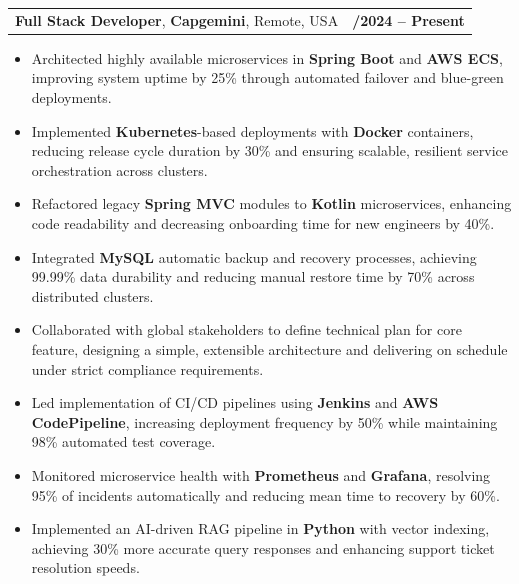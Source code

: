 \documentclass[letterpaper,11pt]{article}
\makeatletter
\newcommand{\resumeItem}[1]{
  \item\footnotesize{
    {#1 \vspace{-2pt}}
  }
}
\newcommand{\resumeSubheading}[4]{
  \vspace{-2pt}\item
    \begin{tabular*}{1.0\textwidth}[t]{l@{\extracolsep{\fill}}r}
      \textbf{\fontsize{10pt}{14pt}\selectfont #3}, \textbf{\fontsize{10pt}{14pt}\selectfont #1}, \fontsize{10pt}{14pt}\selectfont #4 & \textbf{\fontsize{10pt}{14pt}\selectfont #2} \\
    \end{tabular*}\vspace{-7pt}
}
\newcommand{\resumeItemListStart}{\begin{itemize}[leftmargin=*]}
\newcommand{\resumeItemListEnd}{\end{itemize}\vspace{-5pt}}
\makeatother
\begin{document}
    \resumeSubheading
        {Capgemini}{01/2024 -- Present}
        {Full Stack Developer}{Remote, USA}
      \resumeItemListStart
        \resumeItem{Architected highly available microservices in \textbf{Spring Boot} and \textbf{AWS ECS}, improving system uptime by 25\% through automated failover and blue-green deployments.}
        \resumeItem{Implemented \textbf{Kubernetes}-based deployments with \textbf{Docker} containers, reducing release cycle duration by 30\% and ensuring scalable, resilient service orchestration across clusters.}
        \resumeItem{Refactored legacy \textbf{Spring MVC} modules to \textbf{Kotlin} microservices, enhancing code readability and decreasing onboarding time for new engineers by 40\%.}
        \resumeItem{Integrated \textbf{MySQL} automatic backup and recovery processes, achieving 99.99\% data durability and reducing manual restore time by 70\% across distributed clusters.}
        \resumeItem{Collaborated with global stakeholders to define technical plan for core feature, designing a simple, extensible architecture and delivering on schedule under strict compliance requirements.}
        \resumeItem{Led implementation of CI/CD pipelines using \textbf{Jenkins} and \textbf{AWS CodePipeline}, increasing deployment frequency by 50\% while maintaining 98\% automated test coverage.}
        \resumeItem{Monitored microservice health with \textbf{Prometheus} and \textbf{Grafana}, resolving 95\% of incidents automatically and reducing mean time to recovery by 60\%.}
        \resumeItem{Implemented an AI-driven RAG pipeline in \textbf{Python} with vector indexing, achieving 30\% more accurate query responses and enhancing support ticket resolution speeds.}
      \resumeItemListEnd
\end{document}
